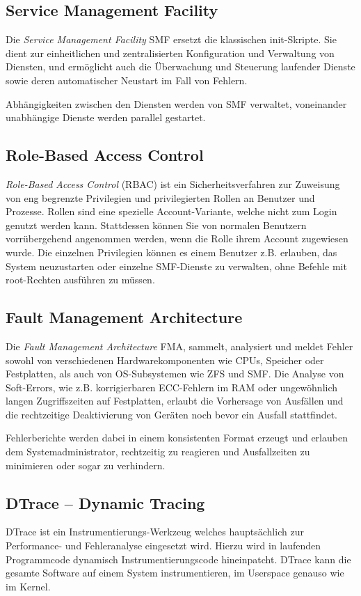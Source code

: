 \documentclass[11pt,foldmark,notumble]{leaflet}
\begin{document}
\subsection{Service Management Facility}
Die \emph{Service Management Facility} SMF ersetzt die klassischen
init-Skripte. Sie dient zur einheitlichen und zentralisierten
Konfiguration und Verwaltung von Diensten, und ermöglicht auch die
Überwachung und Steuerung laufender Dienste sowie deren automatischer
Neustart im Fall von Fehlern.

Abhängigkeiten zwischen den Diensten werden von SMF verwaltet,
voneinander unabhängige Dienste werden parallel gestartet.

\subsection{Role-Based Access Control}
\emph{Role-Based Access Control} (RBAC) ist ein Sicherheitsverfahren
zur Zuweisung von eng begrenzte Privilegien und privilegierten Rollen
an Benutzer und Prozesse. Rollen sind eine spezielle Account-Variante,
welche nicht zum Login genutzt werden kann. Stattdessen können Sie von
normalen Benutzern vorrübergehend angenommen werden, wenn die Rolle
ihrem Account zugewiesen wurde. Die einzelnen Privilegien können es
einem Benutzer z.B. erlauben, das System neuzustarten oder einzelne
SMF-Dienste zu verwalten, ohne Befehle mit root-Rechten ausführen zu
müssen.

\subsection{Fault Management Architecture}
Die \emph{Fault Management Architecture} FMA, sammelt, analysiert und
meldet Fehler sowohl von verschiedenen Hardwarekomponenten wie CPUs,
Speicher oder Festplatten, als auch von OS-Subsystemen wie ZFS und
SMF. Die Analyse von Soft-Errors, wie z.B. korrigierbaren ECC-Fehlern
im RAM oder ungewöhnlich langen Zugriffszeiten auf Festplatten,
erlaubt die Vorhersage von Ausfällen und die rechtzeitige
Deaktivierung von Geräten noch bevor ein Ausfall stattfindet.

Fehlerberichte werden dabei in einem konsistenten Format erzeugt und
erlauben dem Systemadministrator, rechtzeitig zu reagieren und
Ausfallzeiten zu minimieren oder sogar zu verhindern.

\subsection{DTrace -- Dynamic Tracing}
DTrace ist ein Instrumentierungs-Werkzeug welches hauptsächlich zur
Performance- und Fehleranalyse eingesetzt wird. Hierzu wird in
laufenden Programmcode dynamisch Instrumentierungscode hineinpatcht.
DTrace kann die gesamte Software auf einem System instrumentieren,
im Userspace genauso wie im Kernel.
\end{document}
